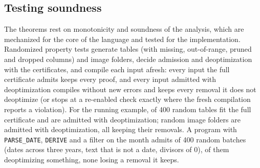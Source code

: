 


\subsection{Testing soundness}\label{sec:soundtest}

The theorems rest on monotonicity and soundness of the analysis, which are mechanized for the core
of the language and tested for the implementation. Randomized property tests generate tables (with missing, out-of-range, pruned and
dropped columns) and image folders, decide admission and deoptimization with the certificates, and
compile each input afresh: every input the full certificate admits keeps every proof, and every input
admitted with deoptimization compiles without new errors and keeps every removal it does not
deoptimize (or stops at a re-enabled check exactly where the fresh compilation reports a violation).
For the running example, \RandFull{} of 400 random tables fit the full certificate and \RandDeopt{} are
admitted with deoptimization; \RandFolders{} random image folders are admitted with deoptimization,
all keeping their removals. A program with \texttt{PARSE\_DATE}, \texttt{DERIVE} and a filter on the
month admits \RandDates{} of 400 random batches (dates across three years, text that is not a date,
divisors of 0), \RandDatesDeopted{} of them deoptimizing something, none losing a removal it keeps.

